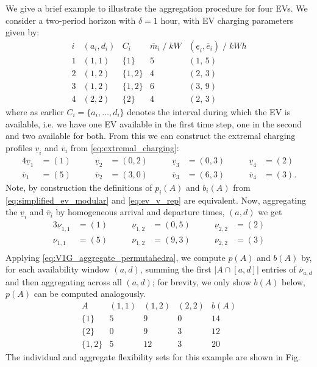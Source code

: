 \begin{exmp}
    We give a brief example to illustrate the aggregation procedure for four EVs. We consider a two-period horizon with $\delta=1$ hour, with EV charging parameters given by:
        \[
    \begin{array}{c|c|c|c|c}
    i & (a_i,d_i) & C_i & \overline m_i \;/\;kW  & (\underline e_i,\overline e_i) \;/\; kWh  \\ \hline
    1 & (1,1) & \{1\}   & 5 & (1,\,5) \\
    2 & (1,2) & \{1,2\} & 4 & (2,\,3)   \\
    3 & (1,2) & \{1,2\} & 6 & (3,\,9) \\
    4 & (2,2) & \{2\} & 4 & (2,\,3)
    \end{array}
    \]
    where as earlier $C_i=\{a_i,\dots,d_i\}$ denotes the interval during which the EV is available, i.e. we have one EV available in the first time step, one in the second and two available for both. From this we can construct the extremal charging profiles $\underline{v}_i$ and $\overline{v}_i$ from \eqref{eq:extremal_charging}:
    \begin{alignat*}{4}
    \underline v_1 &=(1)   &\qquad \underline v_2 &=(0,2) &\qquad \underline v_3 &=(0,3) &\qquad \underline v_4 &=(2)\\
    \overline  v_1 &=(5)   &\qquad \overline  v_2 &=(3,0) &\qquad \overline  v_3 &=(6,3) &\qquad \overline v_4 &=(3).
    \end{alignat*}
    Note, by construction the definitions of $p_i(A)$ and $b_i(A)$ from \eqref{eq:simplified_ev_modular} and \eqref{eq:ev_v_rep} are equivalent. Now, aggregating the $\underline v_i$ and $\overline v_i$ by homogeneous arrival and departure times, $(a, d)$ we get
    \begin{alignat*}{3}
    \underline \nu_{1,1} &=(1)   &\qquad \underline \nu_{1,2} &=(0,5) &\qquad \underline \nu_{2,2} &=(2)\\
    \overline \nu_{1,1} &=(5)   &\qquad \overline \nu_{1,2} &=(9,3) &\qquad \overline \nu_{2,2} &=(3)\\
    \end{alignat*}
    Applying \eqref{eq:V1G_aggregate_permutahedra}, we compute \(p(A)\) and \(b(A)\) by, for each availability window \((a,d)\), summing the first \(|A\cap[a,d]|\) entries of \(\overline{\nu}_{a,d}\) and then aggregating across all \((a,d)\); for brevity, we only show \(b(A)\) below, $p(A)$ can be computed analogously.
    \[
    \begin{array}{c|ccc|c}
    A & (1,1) & (1,2) & (2,2) & b(A) \\ \hline
    \{1\}   & 5 & 9  & 0 & 14 \\
    \{2\}   & 0 & 9  & 3 & 12 \\
    \{1,2\} & 5 & 12 & 3 & 20
    \end{array}
    \]
    The individual and aggregate flexibility sets for this example are shown in Fig.
    \end{exmp}
    